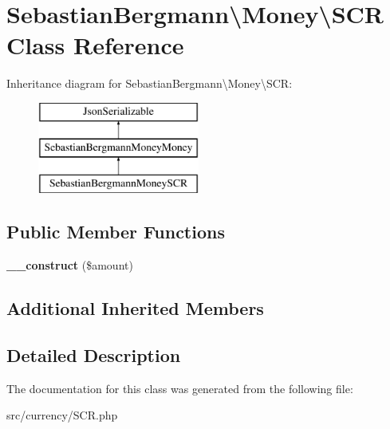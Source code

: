 \hypertarget{classSebastianBergmann_1_1Money_1_1SCR}{}\section{Sebastian\+Bergmann\textbackslash{}Money\textbackslash{}S\+C\+R Class Reference}
\label{classSebastianBergmann_1_1Money_1_1SCR}
Inheritance diagram for Sebastian\+Bergmann\textbackslash{}Money\textbackslash{}S\+C\+R\+:\begin{figure}[H]
\begin{center}
\leavevmode
\includegraphics[height=3.000000cm]{classSebastianBergmann_1_1Money_1_1SCR}
\end{center}
\end{figure}
\subsection*{Public Member Functions}
\begin{DoxyCompactItemize}
\item 
\hypertarget{classSebastianBergmann_1_1Money_1_1SCR_a0da1008c3d2d8c89d3c78517c62ee364}{}{\bfseries \+\_\+\+\_\+construct} (\$amount)\label{classSebastianBergmann_1_1Money_1_1SCR_a0da1008c3d2d8c89d3c78517c62ee364}

\end{DoxyCompactItemize}
\subsection*{Additional Inherited Members}


\subsection{Detailed Description}


The documentation for this class was generated from the following file\+:\begin{DoxyCompactItemize}
\item 
src/currency/S\+C\+R.\+php\end{DoxyCompactItemize}
